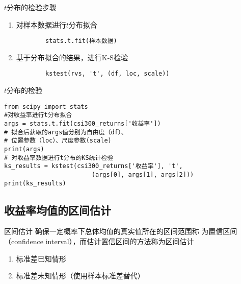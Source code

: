 \documentclass[t]{beamer}
\begin{document}
\begin{frame}[fragile]{$t$分布的检验步骤}
\begin{enumerate}
    \item 对样本数据进行$t$分布拟合
    \begin{lstlisting}
        stats.t.fit(样本数据)
    \end{lstlisting}
    \item 基于分布拟合的结果，进行K-S检验
    \begin{lstlisting}
        kstest(rvs, 't', (df, loc, scale))
    \end{lstlisting}
\end{enumerate}
\end{frame}


\begin{frame}[fragile]{$t$分布的检验}
\begin{lstlisting}
from scipy import stats
#对收益率进行t分布拟合
args = stats.t.fit(csi300_returns['收益率']) 
# 拟合后获取的args值分别为自由度（df）、
# 位置参数（loc）、尺度参数(scale)
print(args) 
# 对收益率数据进行t分布的KS统计检验
ks_results = kstest(csi300_returns['收益率'], 't', 
                        (args[0], args[1], args[2]))
print(ks_results)
\end{lstlisting}
\end{frame}

\subsection{收益率均值的区间估计}
\begin{frame}[fragile]{区间估计}
确保一定概率下总体均值的真实值所在的区间范围称
为置信区间（confidence interval），而估计置信区间的方法称为区间估计
\begin{enumerate}
    \item 标准差已知情形
    \item 标准差未知情形（使用样本标准差替代）
\end{enumerate}
\end{frame}
\end{document}
